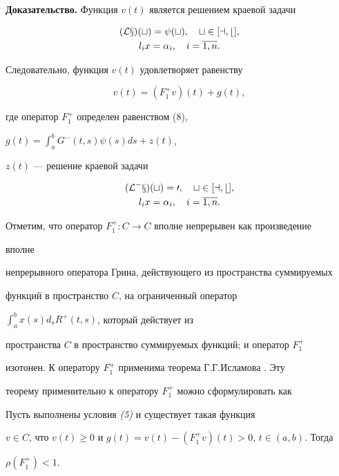  


{\bf Доказательство.} Функция $v(t)$ является решением краевой задачи 


\begin{gather*} 


(\cal Lx)(t)=\psi(t),\quad t\in[a,b],\\ 


l_ix=\alpha_i,\quad i=\overline{1,n}. 


\end{gather*} 


Следовательно, функция $v(t)$ удовлетворяет равенству 


$$ 


v(t)=(F^+_1v)(t)+g(t), 


$$ 


где оператор $F^+_1$ определен равенством (8), 


$g(t)=\int^b_aG^-(t,s)\psi(s)ds+z(t)$, 


$z(t)$ --- решение краевой задачи 


\begin{gather*} 


(\cal L^-x)(t)=0,\quad t\in[a,b],\\ 


l_ix=\alpha_i,\quad i=\overline{1,n}.


\end{gather*} 





Отметим, что оператор $F^+_1:C\to C$ вполне непрерывен как произведение 


вполне 


непрерывного оператора Грина, действующего из пространства суммируемых 


функций в пространство $C$, на ограниченный оператор 


$\int^b_ax(s)d_sR^+(t,s)$, который действует из 


пространства $C$ в пространство суммируемых функций; и оператор $F^+_1$ 


изотонен. К оператору $F^+_1$ применима теорема Г.Г.Исламова \cite{Is}. Эту 


теорему применительно к оператору $F^+_1$ можно сформулировать как 


 


\begin{prop} Пусть выполнены условия {\em (5)} и существует такая функция 


$v\in C$, что $v(t)\ge 0$ и $g(t)=v(t)-(F^+_1v)(t)>0$, $t\in(a,b)$. Тогда 


$\rho(F^+_1)<1$. 


\end{prop} 


